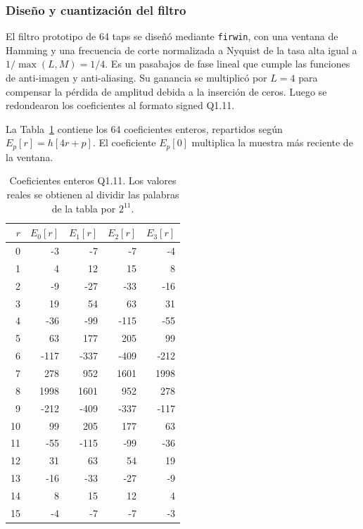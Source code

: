 \documentclass[10pt,a4paper]{article}
\begin{document}
\subsubsection*{Diseño y cuantización del filtro}

El filtro prototipo de 64 taps se diseñó mediante \texttt{firwin}, con una
ventana de Hamming y una frecuencia de corte normalizada a Nyquist de la tasa
alta igual a $1/\max(L,M)=1/4$. Es un pasabajos de fase lineal que cumple las
funciones de anti-imagen y anti-aliasing. Su ganancia se multiplicó por $L=4$
para compensar la pérdida de amplitud debida a la inserción de ceros. Luego se
redondearon los coeficientes al formato signed Q1.11.

La Tabla~\ref{tab:coeficientes-fases} contiene los 64 coeficientes enteros,
repartidos según $E_p[r]=h[4r+p]$. El coeficiente $E_p[0]$ multiplica la muestra
más reciente de la ventana.

\begin{table}[H]
    \centering
    \caption{Coeficientes enteros Q1.11. Los valores reales se obtienen al dividir
    las palabras de la tabla por $2^{11}$.}
    \label{tab:coeficientes-fases}
    \begin{tabular}{@{}rrrrr@{}}
        \toprule
        $r$ & $E_0[r]$ & $E_1[r]$ & $E_2[r]$ & $E_3[r]$ \\
        \midrule
        0 & -3 & -7 & -7 & -4 \\
        1 & 4 & 12 & 15 & 8 \\
        2 & -9 & -27 & -33 & -16 \\
        3 & 19 & 54 & 63 & 31 \\
        4 & -36 & -99 & -115 & -55 \\
        5 & 63 & 177 & 205 & 99 \\
        6 & -117 & -337 & -409 & -212 \\
        7 & 278 & 952 & 1601 & 1998 \\
        8 & 1998 & 1601 & 952 & 278 \\
        9 & -212 & -409 & -337 & -117 \\
        10 & 99 & 205 & 177 & 63 \\
        11 & -55 & -115 & -99 & -36 \\
        12 & 31 & 63 & 54 & 19 \\
        13 & -16 & -33 & -27 & -9 \\
        14 & 8 & 15 & 12 & 4 \\
        15 & -4 & -7 & -7 & -3 \\
        \bottomrule
    \end{tabular}
\end{table}
\end{document}
